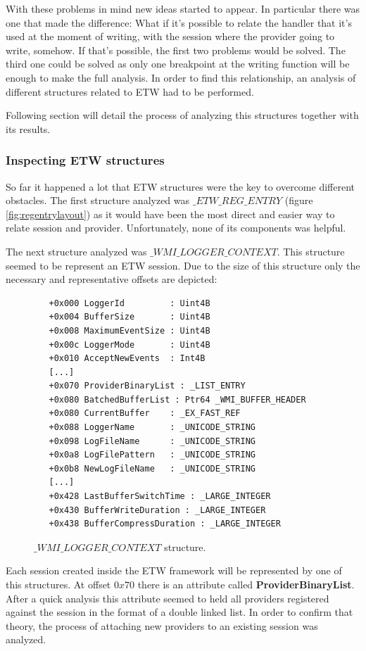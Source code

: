 With these problems in mind new ideas started to appear. In particular there was one that made the difference: What if it's possible to relate the handler that it's used at the moment of writing, with the session where the provider going to write, somehow. If that's possible, the first two problems would be solved. The third one could be solved as only one breakpoint at the writing function will be enough to make the full analysis. In order to find this relationship, an analysis of different structures related to ETW had to be performed.

Following section will detail the process of analyzing this structures together with its results.


\subsubsection{\bfseries Inspecting ETW structures}
So far it happened a lot that ETW structures were the key to overcome different obstacles. The first structure analyzed was $\_ETW\_REG\_ENTRY$ (figure \ref{fig:regentrylayout}) as it would have been the most direct and easier way to relate session and provider. Unfortunately, none of its components was helpful.

The next structure analyzed was $\_WMI\_LOGGER\_CONTEXT$. This structure seemed to be represent an ETW session. Due to the size of this structure only the necessary and representative offsets are depicted: 

\begin{figure}[H]
  \begin{lstlisting}
   +0x000 LoggerId         : Uint4B
   +0x004 BufferSize       : Uint4B
   +0x008 MaximumEventSize : Uint4B
   +0x00c LoggerMode       : Uint4B
   +0x010 AcceptNewEvents  : Int4B
   [...]
   +0x070 ProviderBinaryList : _LIST_ENTRY
   +0x080 BatchedBufferList : Ptr64 _WMI_BUFFER_HEADER
   +0x080 CurrentBuffer    : _EX_FAST_REF
   +0x088 LoggerName       : _UNICODE_STRING
   +0x098 LogFileName      : _UNICODE_STRING
   +0x0a8 LogFilePattern   : _UNICODE_STRING
   +0x0b8 NewLogFileName   : _UNICODE_STRING
   [...]
   +0x428 LastBufferSwitchTime : _LARGE_INTEGER
   +0x430 BufferWriteDuration : _LARGE_INTEGER
   +0x438 BufferCompressDuration : _LARGE_INTEGER
  \end{lstlisting} 
  \caption[]{$\_WMI\_LOGGER\_CONTEXT$ structure.}
  \label{fig:wmi_logger_context}
\end{figure}

Each session created inside the ETW framework will be represented by one of this structures. At offset $0x70$ there is an attribute called {\bfseries ProviderBinaryList}. After a quick analysis this attribute seemed to held all providers registered against the session in the format of a double linked list. In order to confirm that theory, the process of attaching new providers to an existing session was analyzed. 

